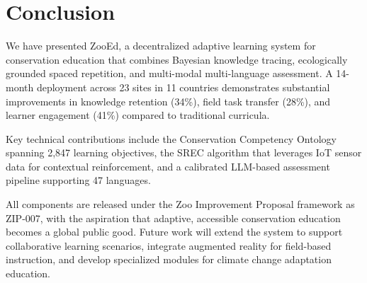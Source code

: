 \section{Conclusion}

\label{sec:conclusion}

We have presented ZooEd, a decentralized adaptive learning system for conservation education that combines Bayesian knowledge tracing, ecologically grounded spaced repetition, and multi-modal multi-language assessment.
A 14-month deployment across 23 sites in 11 countries demonstrates substantial improvements in knowledge retention (34\%), field task transfer (28\%), and learner engagement (41\%) compared to traditional curricula.

Key technical contributions include the Conservation Competency Ontology spanning 2,847 learning objectives, the SREC algorithm that leverages IoT sensor data for contextual reinforcement, and a calibrated LLM-based assessment pipeline supporting 47 languages.

All components are released under the Zoo Improvement Proposal framework as ZIP-007, with the aspiration that adaptive, accessible conservation education becomes a global public good.
Future work will extend the system to support collaborative learning scenarios, integrate augmented reality for field-based instruction, and develop specialized modules for climate change adaptation education.

